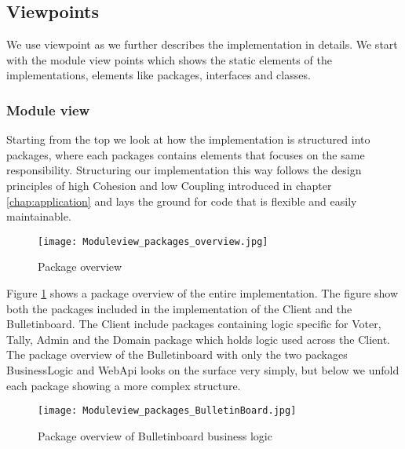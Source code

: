 \subsection{Viewpoints}
We use viewpoint as we further describes the implementation in details. We start with the module view points which shows the static elements of the implementations, elements like packages, interfaces and classes.  \\

\subsubsection{Module view}
Starting from the top we look at how the implementation is structured into packages, where each packages contains elements that focuses on the same responsibility. Structuring our implementation this way follows the design principles of high Cohesion and low Coupling introduced in chapter \ref{chap:application} and lays the ground for code that is flexible and easily maintainable. 

\begin{figure}[H]
    \centering
    \texttt{[image: Moduleview\_packages\_overview.jpg]}
    \caption{Package overview}
    \label{fig:package_overview}
\end{figure}

\noindent
Figure \ref{fig:package_overview} shows a package overview of the entire implementation. The figure show both the packages included in the implementation of the Client and the Bulletinboard. The Client include packages containing logic specific for Voter, Tally, Admin and the Domain package which holds logic used across the Client. The package overview of the Bulletinboard with only the two packages BusinessLogic and WebApi looks on the surface very simply, but below we unfold each package showing a more complex structure. 

\begin{figure}[H]
    \centering
    \texttt{[image: Moduleview\_packages\_BulletinBoard.jpg]}
    \caption{Package overview of Bulletinboard business logic}
    \label{fig:package_overview_of_bulletinboard_businesslogic}
\end{figure}

